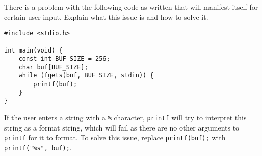 There is a problem with the following code as written that will manifest itself for certain user input. Explain what this issue is and how to solve it.

\begin{verbatim}
#include <stdio.h>

int main(void) {
	const int BUF_SIZE = 256;
    char buf[BUF_SIZE];
    while (fgets(buf, BUF_SIZE, stdin)) {
        printf(buf);
    }
}
\end{verbatim}

\begin{answer}
If the user enters a string with a \texttt{\%} character, \texttt{printf} will try to interpret this string as a format string, which will fail as there are no other arguments to \texttt{printf} for it to format. To solve this issue, replace \texttt{printf(buf);} with \texttt{printf("\%s", buf);}.
\end{answer}